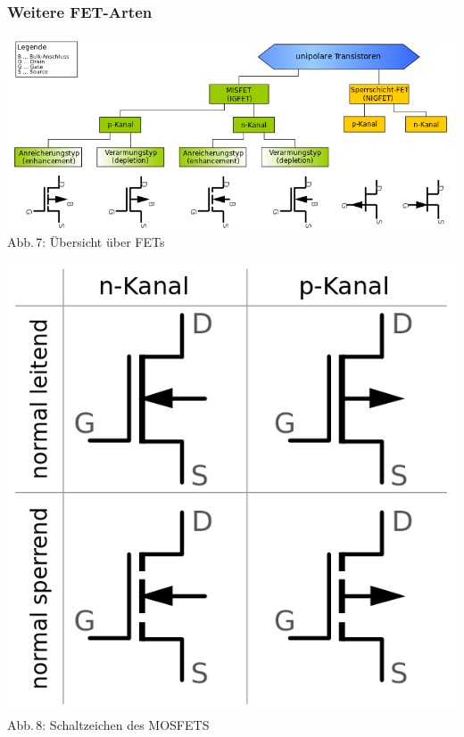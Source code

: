 \begin{frame}
\frametitle{Weitere FET-Arten}
\begin{center}
	\includegraphics[width=\textwidth,height=.8\textheight,keepaspectratio]{a06/FET-overview.png}\\
	{\tiny Abb.\,7: Übersicht über FETs~\cite{wp}}
\end{center}
\end{frame}

\begin{frame}
	\begin{center}
		\includegraphics[width=\textwidth,height=.85\textheight,keepaspectratio]{a06/MOSFET-Symbole.png}\\
		{\tiny Abb.\,8: Schaltzeichen des MOSFETS~\cite{wmde}}
	\end{center}
\end{frame}

